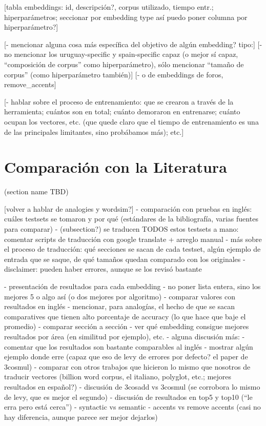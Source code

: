 [tabla embeddings: id, descripción?, corpus utilizado, tiempo entr.; hiperparámetros; seccionar por
embedding type así puedo poner columna por hiperparámetro?]

[- mencionar alguna cosa más específica del objetivo de algún embedding? tipo:]
    [- no mencionar los uruguay-specific y spain-specific capaz (o mejor sí capaz, ``composición de corpus'' como hiperparámetro), sólo mencionar ``tamaño de corpus'' (como hiperparámetro también)]
    [- o de embeddings de foros, remove\_accents]


[- hablar sobre el proceso de entrenamiento: que se crearon a través de la herramienta; cuántos son en total; cuánto demoraron en entrenarse; cuánto ocupan los vectores, etc. (que quede claro que el tiempo de entrenamiento es una de las principales limitantes, sino probábamos más); etc.]



\section{Comparación con la Literatura}
(section name TBD)

[volver a hablar de analogies y wordsim?]
- comparación con pruebas en inglés: cuáles testsets se tomaron y por qué (estándares de la bibliografía, varias fuentes para comparar)
- (subsection?) se traducen TODOS estos testsets a mano: comentar scripts de traducción con google translate + arreglo manual
    - más sobre el proceso de traducción: qué secciones se sacan de cada testset, algún ejemplo de entrada que se saque, de qué tamaños quedan comparado con los originales
    - disclaimer: pueden haber errores, aunque se los revisó bastante

- presentación de resultados para cada embedding
    - no poner lista entera, sino los mejores 5 o algo así (o dos mejores por algoritmo)
    - comparar valores con resultados en inglés
    - mencionar, para analogías, el hecho de que se sacan comparatives que tienen alto porcentaje de accuracy (lo que hace que baje el promedio)
        - comparar sección a sección
    - ver qué embedding consigue mejores resultados por área (en similitud por ejemplo), etc.
- alguna discusión más:
    - comentar que los resultados son bastante comparables al inglés
    - mostrar algún ejemplo donde erre (capaz que eso de levy de errores por defecto? el paper de 3cosmul)
    - comparar con otros trabajos que hicieron lo mismo que nosotros de traducir vectores (billion word corpus, el italiano, polyglot, etc.; mejores resultados en español?)
    - discusión de 3cosadd vs 3cosmul (se corrobora lo mismo de levy, que es mejor el segundo)
    - discusión de resultados en top5 y top10 (``le erra pero está cerca'')
    - syntactic vs semantic
    - accents vs remove accents (casi no hay diferencia, aunque parece ser mejor dejarlos)


